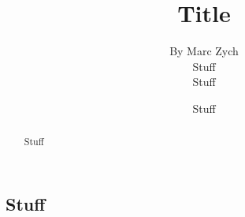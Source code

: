 \documentclass[12pt]{article}
\begin{document}
\title{\vfill Title}

\author{
By Marc Zych \vspace{10pt} \\
Stuff \vspace{10pt} \\
Stuff \vspace{10pt} \\
}
\date{Stuff}

\maketitle

\begin{abstract}
Stuff
\end{abstract}

\thispagestyle{empty}
\newpage

\tableofcontents
\newpage
\begin{multicols}{2}

\section{Stuff}

\end{multicols}

\newpage
\nocite{*}


\end{document}
